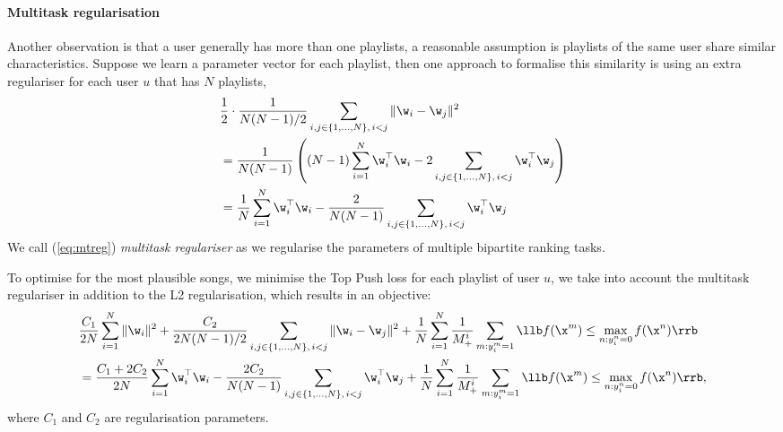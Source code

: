 \paragraph{Multitask regularisation}
Another observation is that a user generally has more than one playlists,
a reasonable assumption is playlists of the same user share similar characteristics. 
Suppose we learn a parameter vector for each playlist, then one approach to formalise this similarity is using an extra regulariser
for each user $u$ that has $N$ playlists,
\begin{equation}
\label{eq:mtreg}
\begin{aligned}
&\frac{1}{2} \cdot \frac{1}{N (N - 1) / 2} \sum_{i, j \in \{1,\dots,N\}, \, i < j} \| \w_i - \w_j \|^2 \\
&= \frac{1}{N (N - 1)} \left( (N - 1) \sum_{i=1}^{N} \w_i^\top \w_i - 2 \sum_{i, j \in \{1,\dots,N\}, \, i < j} \w_i^\top \w_j \right) \\
&= \frac{1}{N} \sum_{i=1}^{N} \w_i^\top \w_i - \frac{2}{N (N - 1)} \sum_{i, j \in \{1,\dots,N\}, \, i < j} \w_i^\top \w_j %
\end{aligned}
\end{equation}
We call (\ref{eq:mtreg}) \emph{multitask regulariser} as we regularise the parameters of multiple bipartite ranking tasks. 

To optimise for the most plausible songs, we minimise the Top Push loss for each playlist of user $u$, 
we take into account the multitask regulariser in addition to the L2 regularisation, 
which results in an objective:
\begin{equation}
\label{eq:mtobj}
\begin{aligned}
&\frac{C_1}{2 N} \sum_{i=1}^{N} \| \w_i \|^2
+ \frac{C_2}{2 N (N - 1) / 2} \sum_{i, j \in \{1,\dots,N\}, \, i < j} \| \w_i - \w_j \|^2 
+ \frac{1}{N} \sum_{i = 1}^{N} \frac{1}{M_+^i} \sum_{m: y_i^m = 1} \llb f(\x^m) \le \max_{n: y_i^n = 0} f(\x^n) \rrb \\
&= \frac{C_1 + 2C_2}{2 N} \sum_{i=1}^{N} \w_i^\top \w_i 
- \frac{2C_2}{N (N - 1)} \sum_{i, j \in \{1,\dots,N\}, \, i < j} \w_i^\top \w_j
+ \frac{1}{N} \sum_{i = 1}^{N} \frac{1}{M_+^i} \sum_{m: y_i^m = 1} \llb f(\x^m) \le \max_{n: y_i^n = 0} f(\x^n) \rrb,
\end{aligned}
\end{equation}
where $C_1$ and $C_2$ are regularisation parameters.

